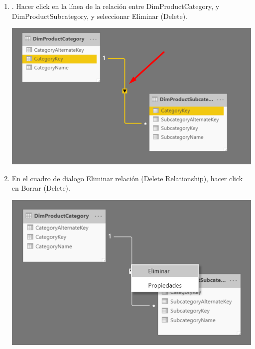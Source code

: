 \begin{itemize}
\begin{enumerate}
\item . Hacer click en la línea de la relación entre DimProductCategory, y DimProductSubcategory, y seleccionar Eliminar (Delete).
\begin{center}
\includegraphics[scale=0.55]{./Imagenes/b5.png}
\end{center}

\item En el cuadro de dialogo Eliminar relación (Delete Relationship), hacer click en Borrar (Delete).
\begin{center}
\includegraphics[scale=0.55]{./Imagenes/b6.png}
\end{center}


\end{enumerate}
\end{itemize}
